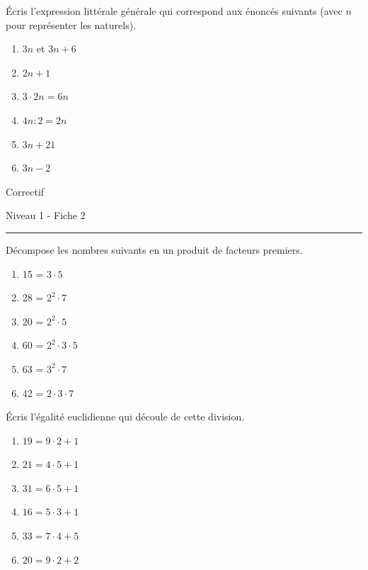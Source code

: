 \documentclass[12pt,parskip=half-, twoside=semi]{scrartcl}
\begin{document}
      \begin{exercise}
          Écris l'expression littérale générale qui correspond aux énoncés suivants (avec \(n\) pour représenter les naturels).
          \begin{enumerate}[cols=2]
            \item \(3n\) et \(3n+6\)
            \item \(2n+1\)
            \item \(3 \cdot 2n = 6n\)
            \item \(4n : 2 = 2n \)
            \item \(3n+21\)
            \item \(3n-2\)
          \end{enumerate}
        \end{exercise}

\newpage 

\begin{center}
  \bfseries
  \begin{Huge}
    Correctif
  \end{Huge}
  \smallbreak
  \begin{large}
    Niveau 1  - Fiche 2
  \end{large}
  \smallbreak
  \rule[10pt]{.5\linewidth}{1 pt}
\end{center}

\setcounter{exercise}{0}
    
    \begin{exercise}
        Décompose les nombres suivants en un produit de facteurs premiers.

      \begin{enumerate}[cols=3]
        \item 15 = $3 \cdot 5$
        \item 28 = $2^2 \cdot 7$
        \item 20 = $2^2 \cdot 5$
        \item 60 = $2^2 \cdot 3 \cdot 5$
        \item 63 = $3^2 \cdot 7$
        \item 42 = $2 \cdot 3 \cdot 7$
      \end{enumerate}
    \end{exercise}
    
    
    \begin{exercise}
      Écris l'égalité euclidienne qui découle de cette
    division.
        \begin{enumerate}[cols=3]
          \item $19 = 9 \cdot 2 + 1$
          \item $21 = 4 \cdot 5 + 1$
          \item $31 = 6 \cdot 5 + 1$
          \item $16 = 5 \cdot 3 + 1$
          \item $33 = 7 \cdot 4 + 5$
          \item $20 = 9 \cdot 2 + 2$
        \end{enumerate}
    \end{exercise}
    
\end{document}
